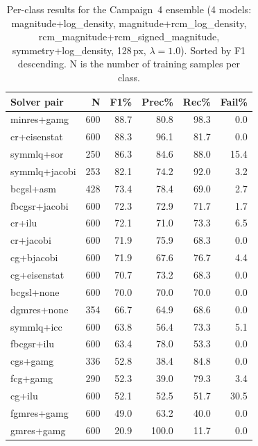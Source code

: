 \begin{table}[H]
  \centering
  \caption[Per-class results for the Campaign~4 ensemble.]{Per-class results for the Campaign~4 ensemble (4 models: magnitude+log\_density,
           magnitude+rcm\_log\_density, rcm\_magnitude+rcm\_signed\_magnitude,
           symmetry+log\_density, 128\,px, $\lambda=1.0$).
           Sorted by F1 descending. N is the number of training samples per class.}
  \label{tab:per-solver-ensemble}
  \begin{tabular}{lrrrrr}
    \toprule
    \textbf{Solver pair} & \textbf{N} & \textbf{F1\%} & \textbf{Prec\%} & \textbf{Rec\%} & \textbf{Fail\%} \\
    \midrule
    minres+gamg      &  600 & 88.7 & 80.8 & 98.3 &  0.0 \\
    cr+eisenstat     &  600 & 88.3 & 96.1 & 81.7 &  0.0 \\
    symmlq+sor       &  250 & 86.3 & 84.6 & 88.0 & 15.4 \\
    symmlq+jacobi    &  253 & 82.1 & 74.2 & 92.0 &  3.2 \\
    bcgsl+asm        &  428 & 73.4 & 78.4 & 69.0 &  2.7 \\
    fbcgsr+jacobi    &  600 & 72.3 & 72.9 & 71.7 &  1.7 \\
    cr+ilu           &  600 & 72.1 & 71.0 & 73.3 &  6.5 \\
    cr+jacobi        &  600 & 71.9 & 75.9 & 68.3 &  0.0 \\
    cg+bjacobi       &  600 & 71.9 & 67.6 & 76.7 &  4.4 \\
    cg+eisenstat     &  600 & 70.7 & 73.2 & 68.3 &  0.0 \\
    bcgsl+none       &  600 & 70.0 & 70.0 & 70.0 &  0.0 \\
    dgmres+none      &  354 & 66.7 & 64.9 & 68.6 &  0.0 \\
    symmlq+icc       &  600 & 63.8 & 56.4 & 73.3 &  5.1 \\
    fbcgsr+ilu       &  600 & 63.4 & 78.0 & 53.3 &  0.0 \\
    cgs+gamg         &  336 & 52.8 & 38.4 & 84.8 &  0.0 \\
    fcg+gamg         &  290 & 52.3 & 39.0 & 79.3 &  3.4 \\
    cg+ilu           &  600 & 52.1 & 52.5 & 51.7 & 30.5 \\
    fgmres+gamg      &  600 & 49.0 & 63.2 & 40.0 &  0.0 \\
    gmres+gamg       &  600 & 20.9 &100.0 & 11.7 &  0.0 \\
    \bottomrule
  \end{tabular}
\end{table}

